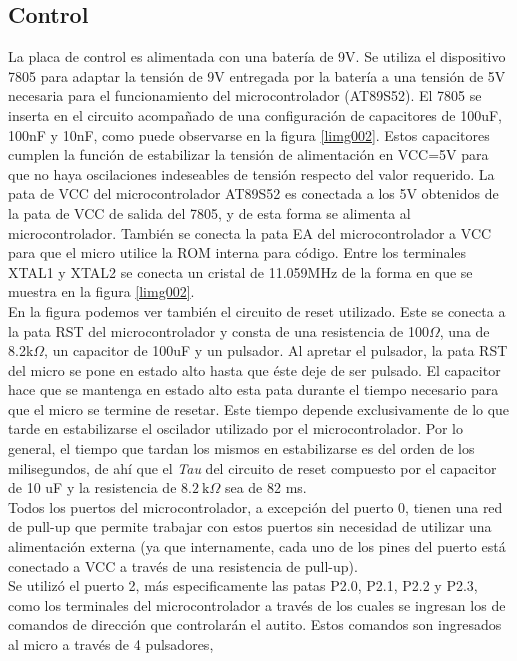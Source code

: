 \documentclass[a4paper,10pt]{article}
\begin{document}
		\subsection{Control}
			La placa de control es alimentada con una batería de 9V. Se utiliza el
			dispositivo 7805 para adaptar la tensión de 9V entregada por la batería
			a una tensión de 5V necesaria para el funcionamiento del microcontrolador (AT89S52).
			El 7805 se inserta en el circuito acompañado de una configuración de capacitores de
			100uF, 100nF y 10nF, como puede observarse en la figura \ref{limg002}. Estos capacitores cumplen la función de estabilizar la tensión de 
			alimentación en VCC=5V para que no haya oscilaciones indeseables de tensión respecto del valor requerido.
			La pata de VCC del microcontrolador AT89S52 es conectada a los 5V obtenidos de la pata de VCC de salida del 7805, y de esta forma se alimenta al 
			microcontrolador. También se conecta la pata EA del microcontrolador a VCC para que el micro utilice la ROM interna para código. Entre los terminales 
			XTAL1 y XTAL2 se conecta un cristal de 11.059MHz de la forma en que se muestra en la figura \ref{limg002}. \\
			\indent En la figura podemos ver también el circuito de reset utilizado. Este se conecta a la pata RST del microcontrolador y consta de una 
			resistencia de 100$\Omega$, una de 8.2k$\Omega$, un capacitor de 100uF y un pulsador. Al apretar el pulsador, la pata RST del micro se pone en estado 
			alto hasta que éste deje de ser pulsado. El capacitor hace que se mantenga en estado alto esta pata durante el tiempo necesario para que el micro se 
			termine de resetar. Este tiempo depende exclusivamente de lo que tarde en estabilizarse el oscilador utilizado por el microcontrolador. Por lo general,
			el tiempo que tardan los mismos en estabilizarse es del orden de los milisegundos, de ahí que el \emph{Tau} del circuito de reset compuesto por el 
			capacitor de 10 uF y la resistencia de $8.2~\text{k}\Omega$ sea de 82 ms. \\   
			\indent Todos los puertos del microcontrolador, a excepción del puerto 0, tienen una red de pull-up que permite trabajar con estos puertos 
			sin necesidad de utilizar una alimentación externa (ya que internamente, cada uno de los pines del puerto está conectado a VCC a través de una 
			resistencia de pull-up).\\
			\indent Se utilizó el puerto 2, más especificamente las patas P2.0, P2.1, P2.2 y P2.3, como los terminales del microcontrolador a través de 
			los cuales se ingresan los de comandos de dirección que controlarán el autito. Estos comandos son ingresados al micro a través de 4 pulsadores, 
\end{document}
